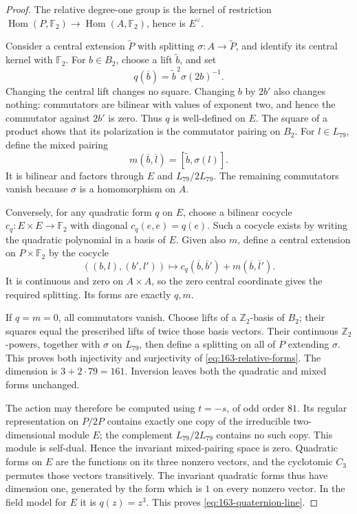 \begin{proof}
The relative degree-one group is the kernel of restriction
\(\operatorname{Hom}(P,\mathbb F_2)\to
\operatorname{Hom}(A,\mathbb F_2)\), hence is \(E^\vee\).

Consider a central extension \(\widetilde P\) with splitting
\(\sigma:A\to\widetilde P\), and identify its central kernel
with \(\mathbb F_2\). For \(b\in B_2\), choose a lift
\(\widetilde b\), and set
\[
 q(\overline b)=\widetilde b^{\,2}\sigma(2b)^{-1}.
\]
Changing the central lift changes no square.
Changing \(b\) by \(2b'\) also changes nothing: commutators
are bilinear with values of exponent two, and hence the
commutator against \(2b'\) is zero. Thus \(q\) is
well-defined on \(E\). The square of a product shows that
its polarization is the commutator pairing on \(B_2\).
For \(l\in L_{79}\), define the mixed pairing
\[
 m(\overline b,\overline l)
             =[\widetilde b,\sigma(l)].
\]
It is bilinear and factors through \(E\) and \(L_{79}/2L_{79}\).
The remaining commutators vanish because \(\sigma\) is
a homomorphism on \(A\).

Conversely, for any quadratic form \(q\) on \(E\), choose
a bilinear cocycle \(c_q:E\times E\to\mathbb F_2\) with
diagonal \(c_q(e,e)=q(e)\). Such a cocycle exists by
writing the quadratic polynomial in a basis of \(E\).
Given also \(m\), define a central extension on
\(P\times\mathbb F_2\) by the cocycle
\[
 ((b,l),(b',l'))\longmapsto
       c_q(\overline b,\overline b')
              +m(\overline b,\overline l').
\]
It is continuous and zero on \(A\times A\), so the zero
central coordinate gives the required splitting.
Its forms are exactly \(q,m\).

If \(q=m=0\), all commutators vanish. Choose lifts of
a \(\mathbb Z_2\)-basis of \(B_2\); their squares equal
the prescribed lifts of twice those basis vectors.
Their continuous \(\mathbb Z_2\)-powers, together with
\(\sigma\) on \(L_{79}\), then define a splitting on
all of \(P\) extending \(\sigma\). This proves both
injectivity and surjectivity of
\eqref{eq:163-relative-forms}. The dimension is
\(3+2\cdot79=161\). Inversion leaves both the quadratic
and mixed forms unchanged.

The action may therefore be computed using \(t=-s\),
of odd order \(81\). Its regular representation on
\(P/2P\) contains exactly one copy of the irreducible
two-dimensional module \(E\); the complement \(L_{79}/2L_{79}\)
contains no such copy. This module is self-dual.
Hence the invariant mixed-pairing space is zero.
Quadratic forms on \(E\) are the functions on its three
nonzero vectors, and the cyclotomic \(C_3\) permutes
those vectors transitively. The invariant quadratic
forms thus have dimension one, generated by the form
which is \(1\) on every nonzero vector.
In the field model for \(E\) it is \(q(z)=z^3\).
This proves \eqref{eq:163-quaternion-line}.


\end{proof}
